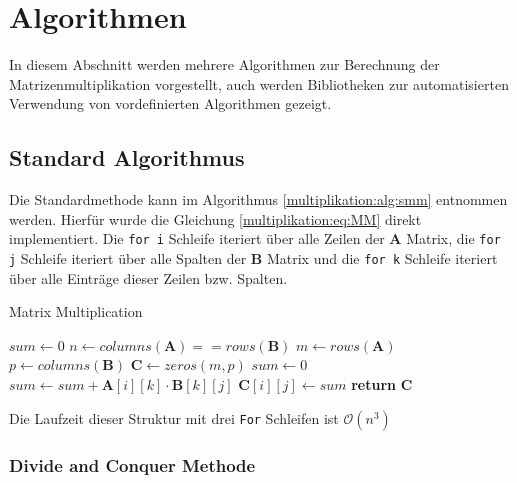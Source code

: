%
%
%

\section{Algorithmen}

In diesem Abschnitt werden mehrere Algorithmen zur Berechnung der Matrizenmultiplikation vorgestellt, auch werden Bibliotheken zur automatisierten Verwendung von vordefinierten Algorithmen gezeigt.

\subsection{Standard Algorithmus}

Die Standardmethode kann im Algorithmus \ref{multiplikation:alg:smm} entnommen werden.
Hierf\"ur wurde die Gleichung \eqref{multiplikation:eq:MM} direkt implementiert.
Die \texttt{for i} Schleife iteriert \"uber alle Zeilen der $\mathbf{A}$ Matrix, die \texttt{for j} Schleife iteriert \"uber alle Spalten der $\mathbf{B}$ Matrix und die \texttt{for k} Schleife iteriert \"uber alle Eintr\"age dieser Zeilen bzw. Spalten.

\begin{algorithm}\footnotesize\caption{Matrix Multiplication}
	\label{multiplikation:alg:smm}
	\setlength{\lineskip}{7pt}
	\begin{algorithmic}[1]
		\State $sum \gets 0$
		\State $n \gets columns(\textbf{A}) == rows(\textbf{B})$
		\State $m \gets rows(\textbf{A})$
		\State $p \gets columns(\textbf{B})$
		\State $\textbf{C} \gets zeros(m,p)$
		\State $sum \gets 0$
		\State $sum \gets  sum + \textbf{A}[i][k] \cdot \textbf{B}[k][j]$
		\EndFor
		\State $\textbf{C}[i][j] \gets  sum $
		\EndFor
		\EndFor
		\State \textbf{return} $\textbf{C}$
		\EndFunction
	\end{algorithmic}
\end{algorithm}

Die Laufzeit dieser Struktur mit drei \texttt{For} Schleifen ist $\mathcal{O}\left(n^3\right)$

\subsubsection{Divide and Conquer Methode}

